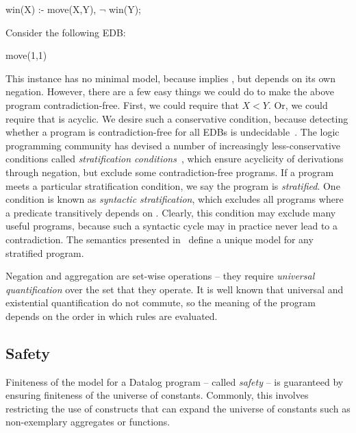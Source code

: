 \begin{Dedalus}
win(X) :- move(X,Y), \(\lnot\) win(Y);
\end{Dedalus}

Consider the following EDB:

\begin{Dedalus}
move(1,1)
\end{Dedalus}

This instance has no minimal model, because  implies
, but  depends on its own negation.  However,
there are a few easy things we could do to make the above program
contradiction-free.  First, we could require that $X < Y$.  Or, we could
require that  is acyclic.  We desire such a conservative
condition, because detecting whether a program is contradiction-free for all
EDBs is undecidable~\cite{papa-yanna}.  The logic programming community has
devised a number of increasingly less-conservative conditions called {\em
stratification conditions}~\cite{local-strat, ross-syntactic, modular,
weak-strat}, which ensure acyclicity of derivations through negation, but
exclude some contradiction-free programs.  If a program meets a particular
stratification condition, we say the program is {\em stratified}.  One
condition is known as {\em syntactic stratification}, which excludes all
programs where a predicate  transitively depends on
.  Clearly, this condition may exclude many useful
programs, because such a syntactic cycle may in practice never lead to a
contradiction.  The semantics presented in~\cite{wellfounded} define a unique
model for any stratified program.

Negation and aggregation are set-wise operations -- they require {\em universal
quantification} over the set that they operate.  It is well known that universal
and existential quantification do not commute, so the meaning of the program
depends on the order in which rules are evaluated.

\subsection{Safety}

Finiteness of the model for a Datalog program -- called {\em safety} -- is
guaranteed by ensuring finiteness of the universe of constants.  Commonly, this
involves restricting the use of constructs that can expand the universe of
constants such as non-exemplary aggregates or functions.


